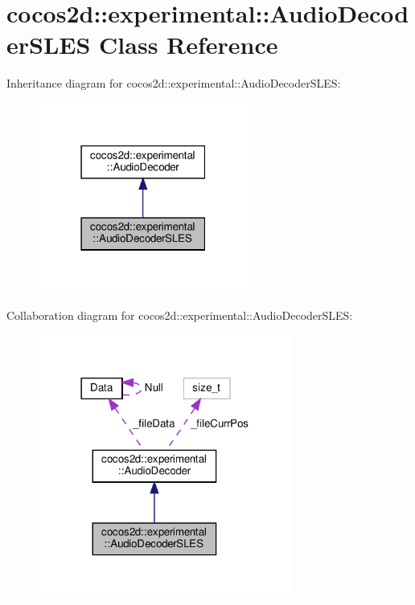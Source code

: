 \hypertarget{classcocos2d_1_1experimental_1_1AudioDecoderSLES}{}\section{cocos2d\+:\+:experimental\+:\+:Audio\+Decoder\+S\+L\+ES Class Reference}
\label{classcocos2d_1_1experimental_1_1AudioDecoderSLES}


Inheritance diagram for cocos2d\+:\+:experimental\+:\+:Audio\+Decoder\+S\+L\+ES\+:
\nopagebreak
\begin{figure}[H]
\begin{center}
\leavevmode
\includegraphics[width=195pt]{classcocos2d_1_1experimental_1_1AudioDecoderSLES__inherit__graph}
\end{center}
\end{figure}


Collaboration diagram for cocos2d\+:\+:experimental\+:\+:Audio\+Decoder\+S\+L\+ES\+:
\nopagebreak
\begin{figure}[H]
\begin{center}
\leavevmode
\includegraphics[width=237pt]{classcocos2d_1_1experimental_1_1AudioDecoderSLES__coll__graph}
\end{center}
\end{figure}
